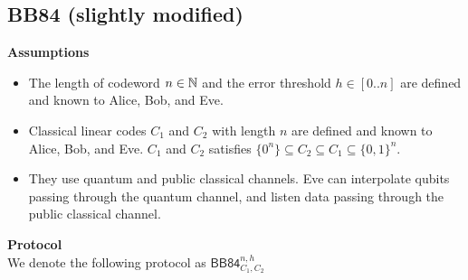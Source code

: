\subsection{BB84 (slightly modified)}
{\bf Assumptions}
\begin{itemize}
 \item The length of codeword $n \in \mathbb{N}$ and the error threshold
       $h \in [0..n]$
       are defined and known to Alice, Bob, and Eve.
 \item Classical linear codes $C_1$ and $C_2$ with length $n$ are
       defined and known to Alice, Bob, and Eve. 
       $C_1$ and $C_2$ satisfies 
       $\{0^n\} \subseteq C_2 \subseteq C_1 \subseteq \{0,1\}^n$.
 \item They use quantum and public classical channels.
       Eve can interpolate qubits passing
       through the quantum channel, and listen data passing through the
       public classical channel.
\end{itemize}
{\bf Protocol}\\
We denote the following protocol as $\mathsf{BB84}^{n,h}_{C_1,C_2}$
